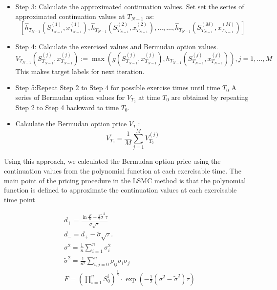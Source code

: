 \documentclass[11pt,a4paper]{article}
\theoremstyle{remark}
\begin{document}
\begin{itemize}
		\item Step 3: Calculate the approximated continuation values. Set set the
		series of approximated continuation values at $T_{N−1}$ as:
		\begin{equation*}
			\left[\hat{h}_{T_{N-1}}\left(S_{T_{N-1}}^{(1)}, x_{T_{N-1}}^{(1)}\right), \hat{h}_{T_{N-1}}\left(S_{T_{N-1}}^{(2)}, x_{T_{N-1}}^{(2)}\right), \ldots, \ldots, \hat{h}_{T_{N-1}}\left(S_{T_{N-1}}^{(M)}, x_{T_{N-1}}^{(M)}\right)\right]
		\end{equation*}
		
		\item Step 4: Calculate the exercised values and Bermudan option values.
		\begin{equation*}
			V_{T_{N-1}}\left(S_{T_{N-1}}^{(j)}, x_{T_{N-1}}^{(j)}\right):=\max \left(g\left(S_{T_{N-1}}^{(j)}, x_{T_{N-1}}^{(j)}\right), h_{T_{N-1}}\left(S_{T_{N-1}}^{(j)}, x_{T_{N-1}}^{(j)}\right)\right), j=1, \ldots, M
		\end{equation*}
		This makes target labels for next iteration.
		
		\item Step 5:Repeat Step 2 to Step 4 for possible exercise times until time $T_0$ A series of Bermudan option values for $V_{T_0}$ at time $T_0$ are obtained by repeating Step 2 to Step 4 backward to time $T_0$.
		
		\item Calculate the Bermudan option price $V_{T_0}$:
		\begin{equation*}
			\overline{V_{T_0}}=\frac{1}{M} \sum_{j=1}^M V_{T_0}^{(j)}
		\end{equation*}
	\end{itemize}
	Using this approach, we calculated the Bermudan option price using the continuation values from the polynomial function at each exercisable time. The main point of the pricing procedure in the LSMC method is that the polynomial function is defined to approximate the continuation values at each exercisable time point
	
	
	\begin{align} 
		& d_{+}=\frac{\ln \frac{F}{K}+\frac{1}{2} \tilde{\sigma}^2 \tau}{\tilde{\sigma} \sqrt{\tau}} \\ 
		& d_{-}=d_{+}-\tilde{\sigma} \sqrt{\tau}. \\
		&\sigma^2 =\frac{1}{n} \sum_{i=1}^n \sigma_i^2 \\ 
		&\tilde{\sigma}^2 =\frac{1}{n^2} \sum_{i, j=0}^n \rho_{i j} \sigma_i \sigma_j \\ 
		&F =\left(\prod_{i=1}^n S^i_0\right)^{\frac{1}{n}} \cdot \exp \left(-\frac{1}{2}\left(\sigma^2-\tilde{\sigma}^2\right) \tau\right)            
	\end{align}	
	
\end{document}
